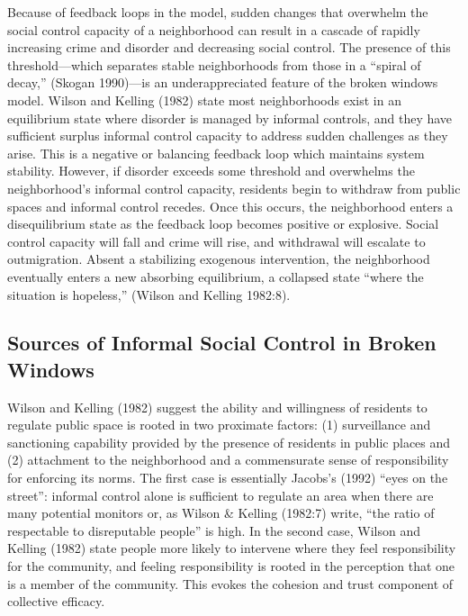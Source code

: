 \documentclass [11pt, proquest] {uwthesis}[2015/03/03]
\begin{document}
Because of feedback loops in the model, sudden changes that overwhelm the social control capacity of a neighborhood can result in a cascade of rapidly increasing crime and disorder and decreasing social control. The presence of this threshold---which separates stable neighborhoods from those in a ``spiral of decay,'' (Skogan 1990)---is an underappreciated feature of the broken windows model. Wilson and Kelling (1982) state most neighborhoods exist in an equilibrium state where disorder is managed by informal controls, and they have sufficient surplus informal control capacity to address sudden challenges as they arise. This is a negative or balancing feedback loop which maintains system stability. However, if disorder exceeds some threshold and overwhelms the neighborhood's informal control capacity, residents begin to withdraw from public spaces and informal control recedes. Once this occurs, the neighborhood enters a disequilibrium state as the feedback loop becomes positive or explosive. Social control capacity will fall and crime will rise, and withdrawal will escalate to outmigration. Absent a stabilizing exogenous intervention, the neighborhood eventually enters a new absorbing equilibrium, a collapsed state ``where the situation is hopeless,'' (Wilson and Kelling 1982:8).

\hypertarget{sources-of-informal-social-control-in-broken-windows}{%
\subsection{Sources of Informal Social Control in Broken Windows}\label{sources-of-informal-social-control-in-broken-windows}}

Wilson and Kelling (1982) suggest the ability and willingness of residents to regulate public space is rooted in two proximate factors: (1) surveillance and sanctioning capability provided by the presence of residents in public places and (2) attachment to the neighborhood and a commensurate sense of responsibility for enforcing its norms. The first case is essentially Jacobs's (1992) ``eyes on the street'': informal control alone is sufficient to regulate an area when there are many potential monitors or, as Wilson \& Kelling (1982:7) write, ``the ratio of respectable to disreputable people'' is high. In the second case, Wilson and Kelling (1982) state people more likely to intervene where they feel responsibility for the community, and feeling responsibility is rooted in the perception that one is a member of the community. This evokes the cohesion and trust component of collective efficacy.
\end{document}
